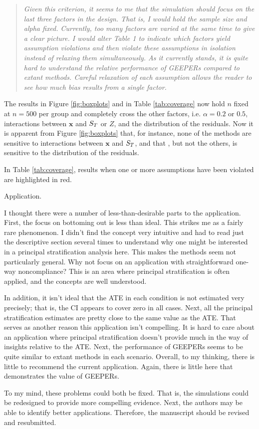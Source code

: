 \documentclass[]{article}
\newenvironment{itquote}
  {\begin{quote} \itshape}
  {\end{quote}\ignorespacesafterend}
\begin{document}
\begin{itquote} Given this criterion, it seems to me that the simulation should focus on the last three factors in the design.  That is, I would hold the sample size and alpha fixed.  Currently, too many factors are varied at the same time to give a clear picture.  
I would alter Table 1 to indicate which factors yield assumption violations and then violate these assumptions in isolation instead of relaxing them simultaneously.  As it currently stands, it is quite hard to understand the relative performance of GEEPERs compared to extant methods. Careful relaxation of each assumption allows the reader to see how much bias results from a single factor. 
\end{itquote}
The results in Figure \ref{fig:boxplots} and in Table \ref{tab:coverage} now hold $n$ fixed at $n=500$ per group and completely cross the other factors, i.e. $\alpha=0.2$ or $0.5$, interactions between $\bm{x}$ and $S_T$ or $Z$, and the distribution of the residuals.
Now it is apparent from Figure \ref{fig:boxplots} that, for instance, none of the methods are sensitive to interactions between $\bm{x}$ and $S_T$, and that \pmm, but not the others, is sensitive to the distribution of the residuals.  

In Table \ref{tab:coverage}, results when one or more assumptions have been violated are highlighted in red.



Application.

I thought there were a number of less-than-desirable parts to the application. First, the focus on bottoming out is less than ideal. This strikes me as a fairly rare phenomenon. I didn't find the concept very intuitive and had to read just the descriptive section several times to understand why one might be interested in a principal stratification analysis here.  This makes the methods seem not particularly general.  Why not focus on an application with straightforward one-way noncompliance? This is an area where principal stratification is often applied, and the concepts are well understood.

In addition, it isn't ideal that the ATE in each condition is not estimated very precisely; that is, the CI appears to cover zero in all cases. Next, all the principal stratification estimates are pretty close to the same value as the ATE. That serves as another reason this application isn't compelling. It is hard to care about an application where principal stratification doesn't provide much in the way of insights relative to the ATE. Next, the performance of GEEPERs seems to be quite similar to extant methods in each scenario. Overall, to my thinking, there is little to recommend the current application. Again, there is little here that demonstrates the value of GEEPERs.

To my mind, these problems could both be fixed.  That is, the simulations could be redesigned to provide more compelling evidence. Next, the authors may be able to identify better applications.  Therefore, the manuscript should be revised and resubmitted.
\end{document}
